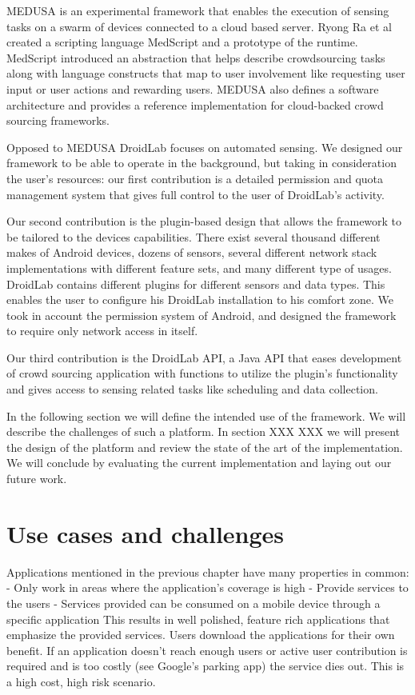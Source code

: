 \documentclass[conference,letterpaper]{IEEEtran}
\begin{document}
MEDUSA is an experimental framework that enables the execution of sensing tasks on a swarm of devices connected to a cloud based server. Ryong Ra et al created a scripting language MedScript and a prototype of the runtime. MedScript introduced an abstraction that helps describe crowdsourcing tasks along with language constructs that map to user involvement like requesting user input or user actions and rewarding users. MEDUSA also defines a software architecture and provides a reference implementation for cloud-backed crowd sourcing frameworks.

Opposed to MEDUSA DroidLab focuses on automated sensing. We designed our framework to be able to operate in the background, but taking in consideration the user's resources: our first contribution is a detailed permission and quota management system that gives full control to the user of DroidLab's activity.

Our second contribution is the plugin-based design that allows the framework to be tailored to the devices capabilities. There exist several thousand different makes of Android devices, dozens of sensors, several different network stack implementations with different feature sets, and many different type of usages. DroidLab contains different plugins for different sensors and data types. This enables the user to configure his DroidLab installation to his comfort zone. We took in account the permission system of Android, and designed the framework to require only network access in itself.

Our third contribution is the DroidLab API, a Java API that eases development of crowd sourcing application with functions to utilize the plugin's functionality and gives access to sensing related tasks like scheduling and data collection.

In the following section we will define the intended use of the framework. We will describe the challenges of such a platform. In section XXX XXX we will present the design of the platform and review the state of the art of the implementation. We will conclude by evaluating the current implementation and laying out our future work.

\section{Use cases and challenges}
\label{sec:use_cases}
Applications mentioned in the previous chapter have many properties in common:
- Only work in areas where the application's coverage is high
- Provide services to the users
- Services provided can be consumed on a mobile device through a specific application
This results in well polished, feature rich applications that emphasize the provided services. Users download the applications for their own benefit. If an application doesn't reach enough users or active user contribution is required and is too costly (see Google's parking app) the service dies out. This is a high cost, high risk scenario.
\end{document}
